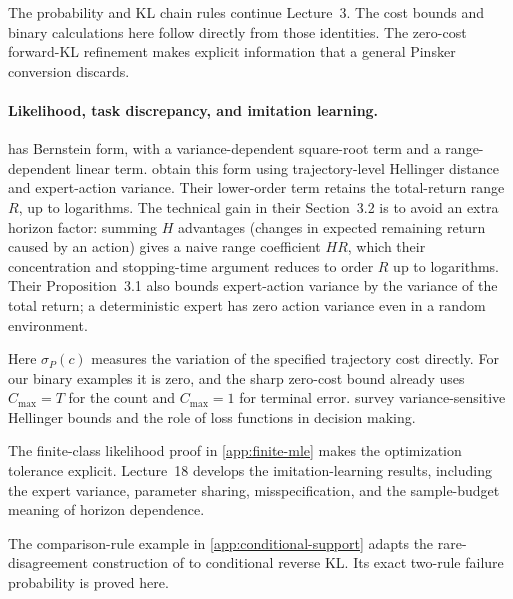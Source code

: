 \documentclass[11pt,twoside]{article}
\theoremstyle{definition}
\theoremstyle{remark}
\begin{document}
The probability and KL chain rules continue Lecture~3.
The cost bounds and binary calculations here follow directly from those
identities. The zero-cost forward-KL refinement makes explicit information
that a general Pinsker conversion discards.

\paragraph{Likelihood, task discrepancy, and imitation learning.}
 has Bernstein form, with a variance-dependent
square-root term and a range-dependent linear term.
\citet[Theorem~3.1]{foster2024} obtain this form using trajectory-level
Hellinger distance and expert-action variance. Their lower-order term
retains the total-return range \(R\), up to logarithms.
The technical gain in their Section~3.2 is to avoid an extra horizon
factor: summing \(H\) advantages (changes in expected remaining return
caused by an action) gives a naive range coefficient \(HR\), which
their concentration and stopping-time argument reduces to order \(R\)
up to logarithms. Their Proposition~3.1 also bounds expert-action
variance by the variance of the total return; a deterministic expert
has zero action variance even in a random environment.

Here \(\sigma_P(c)\) measures the variation of the specified trajectory
cost directly. For our binary examples it is zero, and the sharp
zero-cost bound already uses \(C_{\max}=T\) for the count and
\(C_{\max}=1\) for terminal error.
\citet{wang2025} survey variance-sensitive Hellinger bounds and the
role of loss functions in decision making.

The finite-class likelihood proof in \cref{app:finite-mle} makes the
optimization tolerance explicit.
Lecture~18 develops the imitation-learning results, including the expert
variance, parameter sharing, misspecification, and the sample-budget
meaning of horizon dependence.

The comparison-rule example in \cref{app:conditional-support} adapts
the rare-disagreement construction of \citet[Theorem~3.2]{gyorgy2025}
to conditional reverse KL. Its exact two-rule failure probability is
proved here.
\end{document}
